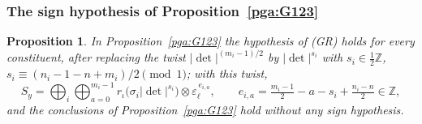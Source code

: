 \documentclass[10pt]{amsart}
\newtheorem{proposition}[theorem]{Proposition}
\theoremstyle{definition}
\theoremstyle{remark}
\newcommand{\Z}{\mathbb Z}
\begin{document}
\subsubsection{The sign hypothesis of Proposition~\ref{pga:G123}}\label{pax:ss-sign}

\begin{proposition}\label{pax:sign}
In Proposition~\ref{pga:G123} the hypothesis of (GR) holds for every constituent, after replacing the
twist $|\det|^{(m_i-1)/2}$ by $|\det|^{s_i}$ with $s_i\in\frac12\Z$, $s_i\equiv(n_i-1-n+m_i)/2
\pmod1$; with this twist,
\[
S_y=\bigoplus_i\bigoplus_{a=0}^{m_i-1}r_\iota\bigl(\sigma_i|\det|^{s_i}\bigr)\otimes
\varepsilon_\ell^{\,e_{i,a}},\qquad e_{i,a}=\tfrac{m_i-1}2-a-s_i+\tfrac{n_i-n}2\in\Z ,
\]
and the conclusions of Proposition~\ref{pga:G123} hold without any sign hypothesis.
\end{proposition}
\end{document}

